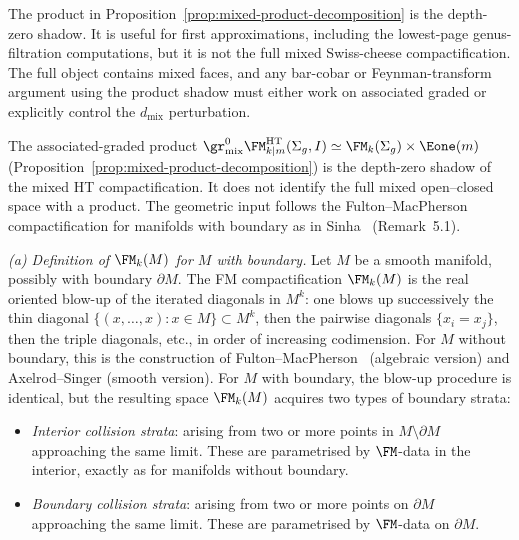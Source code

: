 \begin{remark}
\label{rem:product-strictness}
The product in Proposition~\ref{prop:mixed-product-decomposition}
is the depth-zero shadow. It is useful for first approximations,
including the lowest-page genus-filtration computations, but it is
not the full mixed Swiss-cheese compactification. The full object
contains mixed faces, and any bar-cobar or Feynman-transform
argument using the product shadow must either work on associated
graded or explicitly control the $d_{\mathrm{mix}}$ perturbation.
\end{remark}

\begin{remark}
\label{rem:FM-boundary}
The associated-graded product
$\gr^0_{\mathrm{mix}}\FM^{\mathrm{HT}}_{k|m}(\Sigma_g,I)
\simeq \FM_k(\Sigma_g) \times \Eone(m)$
(Proposition~\ref{prop:mixed-product-decomposition}) is the depth-zero
shadow of the mixed HT compactification. It does not identify the full
mixed open--closed space with a product. The geometric input follows
the Fulton--MacPherson compactification for manifolds with
boundary as in Sinha~\cite{Sinha2004} (Remark~5.1).

\medskip\noindent
\emph{(a) Definition of $\FM_k(M)$ for $M$ with boundary.}
Let $M$ be a smooth manifold, possibly with boundary
$\partial M$. The FM compactification $\FM_k(M)$ is the
real oriented blow-up of the iterated diagonals in $M^k$:
one blows up successively the thin diagonal
$\{(x, \ldots, x) : x \in M\} \subset M^k$, then the
pairwise diagonals $\{x_i = x_j\}$, then the triple
diagonals, etc., in order of increasing codimension. For
$M$ without boundary, this is the construction of
Fulton--MacPherson~\cite{FM94} (algebraic version) and
Axelrod--Singer (smooth version). For $M$ with
boundary, the blow-up procedure is identical, but the
resulting space $\FM_k(M)$ acquires two types of boundary
strata:
\begin{itemize}
\item \emph{Interior collision strata}: arising from two or
 more points in $M \setminus \partial M$ approaching the same
 limit. These are parametrised by $\FM$-data in the interior,
 exactly as for manifolds without boundary.
\item \emph{Boundary collision strata}: arising from two or
 more points on $\partial M$ approaching the same limit.
 These are parametrised by $\FM$-data on $\partial M$.
\end{itemize}


\end{remark}
